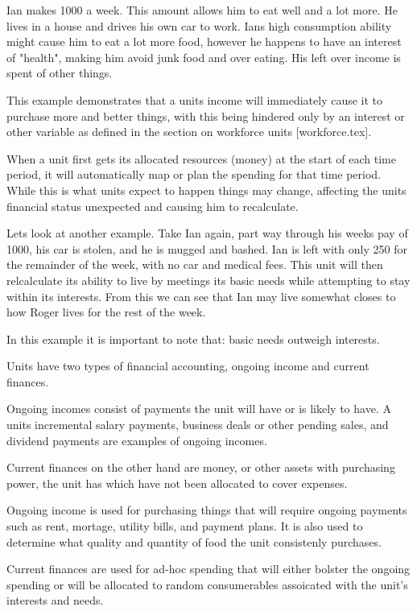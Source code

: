Ian makes  1000 a week. This amount allows him to eat well and a lot more. He lives in a house and drives his own car to work. Ians high consumption ability might cause him to eat a lot more food, however he happens to have an interest of "health", making him avoid junk food and over eating. His left over income is spent of other things.

This example demonstrates that a units income will immediately cause it to purchase more and better things, with this being hindered only by an interest or other variable as defined in the section on workforce units [workforce.tex].


When a unit first gets its allocated resources (money) at the start of each time period, it will automatically map or plan the spending for that time period. While this is what units expect to happen things may change, affecting the units financial status unexpected and causing him to recalculate.

Lets look at another example. Take Ian again, part way through his weeks pay of 1000, his car is stolen, and he is mugged and bashed. Ian is left with only 250 for the remainder of the week, with no car and medical fees. This unit will then relcalculate its ability to live by meetings its basic needs while attempting to stay within its interests. From this we can see that Ian may live somewhat closes to how Roger lives for the rest of the week.

In this example it is important to note that: basic needs outweigh interests.


Units have two types of financial accounting, ongoing income and current finances.

Ongoing incomes consist of payments the unit will have or is likely to have. A units incremental salary payments, business deals or other pending sales, and dividend payments are examples of ongoing incomes.

Current finances on the other hand are money, or other assets with purchasing power, the unit has which have not been allocated to cover expenses.

Ongoing income is used for purchasing things that will require ongoing payments such as rent, mortage, utility bills, and payment plans. It is also used to determine what quality and quantity of food the unit consistenly purchases.

Current finances are used for ad-hoc spending that will either bolster the ongoing spending or will be allocated to random consumerables assoicated with the unit's interests and needs.

